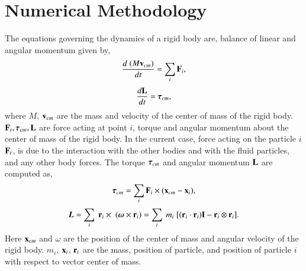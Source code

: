 \section{Numerical Methodology}
\label{sec:rfc:rbd}
The equations governing the dynamics of a rigid body are, balance of linear and
angular momentum given by,
\begin{equation}
  \label{eq:rfc:balance_linear_mom}
  \frac{d \; (M \mathbf{v}_{cm})}{d t} = \sum_i \mathbf{F}_i,
\end{equation}
\begin{equation}
  \label{eq:rfc:balance_angular_mom}
  \frac{d \mathbf{L}}{d t} = \boldsymbol{\tau}_{cm},
\end{equation}
where $M$, $\mathbf{v}_{cm}$ are the mass and velocity of the center of mass of the rigid body.
$\mathbf{F}_i, \boldsymbol{\tau}_{cm}, \mathbf{L} $ are force acting at point $i$, torque and
angular momentum about the center of mass of the rigid body. In the current
case, force acting on the particle $i$ $\mathbf{F}_i$, is due to the interaction
with the other bodies and with the fluid particles, and any other body forces.
The torque $\boldsymbol{\tau}_{cm}$ and angular momentum $\mathbf{L}$ are computed as,
\begin{equation}
  \label{eq:rfc:torque}
 \boldsymbol{\tau}_{cm} = \sum_i \mathbf{F}_i \times (\mathbf{x}_{cm} - \mathbf{x}_{i}),
\end{equation}
\begin{equation}
  \label{eq:rfc:moi}
  \boldsymbol{L} =
  \sum_i \; \mathbf{r}_i \times \; (\boldsymbol{\omega} \times \mathbf{r}_i)
  = \sum_i \; m_i \; [(\mathbf{r}_i \cdot \mathbf{r}_i) \mathbf{I} - \mathbf{r}_i \otimes \mathbf{r}_i].
\end{equation}
Here $\mathbf{x}_{cm}$ and $\omega$ are the position of the center of mass and
angular velocity of the rigid body. $m_i$, $\mathbf{x}_{i}$, $\mathbf{r}_i$ are the
mass, position of particle, and position of particle $i$ with respect to vector
center of mass.

